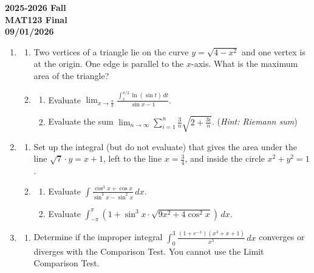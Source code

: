 \documentclass[a4paper, 12pt]{article}
\begin{document}
\pagestyle{empty}

\begin{center}
\textbf{2025-2026 Fall \\MAT123 Final\\09/01/2026}
\end{center}

\begin{enumerate}[leftmargin=*,label=\textbf{\arabic*.}]

\item \begin{enumerate}[leftmargin=*,label=\textbf{\alph*.}]
\item Two vertices of a triangle lie on the curve $y=\sqrt{4-x^2}$ and one vertex is at the origin. One edge is parallel to the $x$-axis. What is the maximum area of the triangle?

\item \begin{enumerate}[leftmargin=*,label=\textbf{\roman*.}]
\item Evaluate $\displaystyle\lim_{x\to\frac{\pi}2}\frac{\displaystyle\int_x^{\pi/2}\ln(\sin t)\,dt}{\sin x-1}$.
\item Evaluate the sum $\displaystyle\lim_{n\to\infty}\sum_{i=1}^n\frac3n\sqrt{2+\frac{3i}{n}}$. (\textit{Hint: Riemann sum})
\end{enumerate}
\end{enumerate}

\item \begin{enumerate}[leftmargin=*,label=\textbf{\alph*.}]

\item Set up the integral (but do not evaluate) that gives the area under the line $\sqrt7\cdot y=x+1$, left to the line $x=\frac34$, and inside the circle $x^2+y^2=1$.

\item \begin{enumerate}[leftmargin=*,label=\textbf{\roman*.}]
\item Evaluate $\displaystyle\int\frac{\cos^3x+\cos x}{\sin^3x-\sin^2x}\,dx$.
\item Evaluate $\displaystyle\int_{-\pi}^{\pi}\left(1+\sin^3x\cdot\sqrt{9x^2+4\cos^2x}\right)\,dx$.
\end{enumerate}
\end{enumerate}

\item \begin{enumerate}[leftmargin=*,label=\textbf{\alph*.}]
\item Determine if the improper integral $\displaystyle\int_0^3\frac{(1+e^{-x})(x^3+x+1)}{x^5}\,dx$ converges or diverges with the Comparison Test. You cannot use the Limit Comparison Test.


\end{enumerate}
\end{enumerate}
\end{document}
